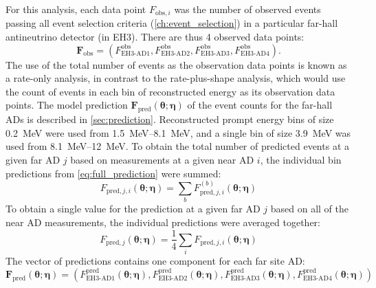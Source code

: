 For this analysis, each data point $F_{\text{obs},i}$
was the number of observed events passing all event selection criteria
(\cref{ch:event_selection})
in a particular far-hall antineutrino detector (in EH3).
There are thus 4 observed data points:
\begin{equation}
    \mathbf{F}_{\text{obs}} =
    (F^{\text{obs}}_{\text{EH3-AD1}},
    F^{\text{obs}}_{\text{EH3-AD2}},
    F^{\text{obs}}_{\text{EH3-AD3}},
    F^{\text{obs}}_{\text{EH3-AD4}}).
\end{equation}
The use of the total number of events as the observation data points
is known as a rate-only analysis,
in contrast to the rate-plus-shape analysis, which would use
the count of events in each bin of reconstructed energy
as its observation data points.
The model prediction
$\mathbf{F}_{\text{pred}}(\boldsymbol{\theta};\boldsymbol{\eta})$
of the event counts for the far-hall ADs
is described in \cref{sec:prediction}.
Reconstructed prompt energy bins of size \SI{0.2}{\MeV} were used from \SIrange{1.5}{8.1}{\MeV},
and a single bin of size \SI{3.9}{\MeV} was used from \SIrange{8.1}{12}{\MeV}.
To obtain the total number of predicted events at a given far AD $j$
based on measurements at a given near AD $i$,
the individual bin predictions from \cref{eq:full_prediction} were summed:
\begin{equation}\label{eq:hybrid_rate_shape}
    F_{\text{pred},j,i}(\boldsymbol{\theta};\boldsymbol{\eta}) =
    \sum_b F_{\text{pred},j,i}^{(b)}(\boldsymbol{\theta};\boldsymbol{\eta})
\end{equation}
To obtain a single value for the prediction at a given far AD $j$
based on all of the near AD measurements,
the individual predictions were averaged together:
\begin{equation}\label{eq:average_near}
    F_{\text{pred},j}(\boldsymbol{\theta};\boldsymbol{\eta}) =
    \frac{1}{4} \sum_i
    F_{\text{pred},j,i}(\boldsymbol{\theta};\boldsymbol{\eta})
\end{equation}
The vector of predictions contains one component for each far site AD:
\begin{equation}\label{eq:f_pred_vector}
    \mathbf{F}_\text{pred}(\boldsymbol{\theta};\boldsymbol{\eta}) =
    (
    F^{\text{pred}}_{\text{EH3-AD1}}(\boldsymbol{\theta};\boldsymbol{\eta}),
    F^{\text{pred}}_{\text{EH3-AD2}}(\boldsymbol{\theta};\boldsymbol{\eta}),
    F^{\text{pred}}_{\text{EH3-AD3}}(\boldsymbol{\theta};\boldsymbol{\eta}),
    F^{\text{pred}}_{\text{EH3-AD4}}(\boldsymbol{\theta};\boldsymbol{\eta})
    )
\end{equation}
